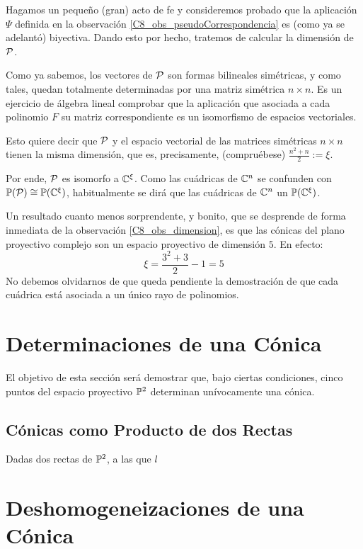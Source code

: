 	Hagamos un pequeño (gran) acto de fe y consideremos probado que la aplicación $\Psi$ definida en la observación \ref{C8_obs_pseudoCorrespondencia} es (como ya se adelantó) biyectiva. Dando esto por hecho, tratemos de calcular la dimensión de $\mc{P}$.
	\begin{obs}[Dimensión de $\mc{P}$]
		\label{C8_obs_dimension}
		Como ya sabemos, los vectores de $\mc{P}$ son formas bilineales simétricas, y como tales, quedan totalmente determinadas por una matriz simétrica $n\times n$. Es un ejercicio de álgebra lineal comprobar que la aplicación que asociada a cada polinomio $F$ su matriz correspondiente es un isomorfismo de espacios vectoriales.
		
		Esto quiere decir que $\mc{P}$ y el espacio vectorial de las matrices simétricas $n\times n$ tienen la misma dimensión, que es, precisamente, (compruébese) $\frac{n^2+n}{2}:=\xi$.
		
		Por ende, $\mc{P}$ es isomorfo a $\mathbb{C}^\xi$. Como las cuádricas de $\mathbb{C}^n$ se confunden con $\mathbb{P}(\mathcal{P})\cong\mathbb{P}(\mathbb{C}^\xi)$, habitualmente se dirá que las cuádricas de $\mathbb{C}^n$  un $\mathbb{P}(\mathbb{C}^\xi)$.
	\end{obs}
	Un resultado cuanto menos sorprendente, y bonito, que se desprende de forma inmediata de la observación \ref{C8_obs_dimension}, es que las cónicas del plano proyectivo complejo son un espacio proyectivo de dimensión $5$. En efecto:
	\[\xi=\frac{3^2+3}{2}-1=5\]
	No debemos olvidarnos de que queda pendiente la demostración de que cada cuádrica está asociada a un único rayo de polinomios.
\section{Determinaciones de una Cónica}
El objetivo de esta sección será demostrar que, bajo ciertas condiciones, cinco puntos del espacio proyectivo $\mathbb{P}^2$ determinan unívocamente una cónica.
\subsection{Cónicas como Producto de dos Rectas}
Dadas dos rectas de $\mathbb{P}^2$, a las que $l$
\section{Deshomogeneizaciones de una Cónica}